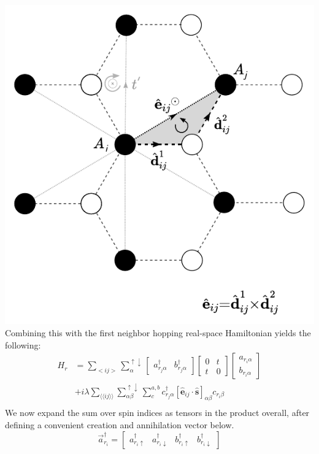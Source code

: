 \documentclass[10pt,a4paper]{article}\usepackage[]{graphicx}\usepackage[]{color}
\begin{document}
\begin{multicols}{2}
\includegraphics[scale=0.7]{hc2nn.pdf}
\noindent
Combining this with the first neighbor hopping real-space Hamiltonian yields the following:
\begin{align*}
H_r &= 
\sum_{<ij>}\sum_{\alpha}^{\uparrow \downarrow}
\begin{bmatrix}
a^{\dagger}_{r_j\alpha} & b^{\dagger}_{r_j\alpha}
\end{bmatrix}
\begin{bmatrix}
0& t\\
t & 0
\end{bmatrix}
\begin{bmatrix}
a_{r_i\alpha} \\ b_{r_i\alpha}
\end{bmatrix}\\
& +i\lambda\sum_{\langle\langle ij \rangle\rangle}\sum_{\alpha\beta}^{\uparrow \downarrow}\sum_{c}^{a,b} c^{\dagger}_{r_j \alpha}\left[ \hat{\mathbf{e}}_{ij}\cdot \hat{\mathbf{s}} \right]_{\alpha\beta}c_{r_i \beta}\\
\end{align*}
We now expand the sum over spin indices as tensors in the product overall, after defining a convenient creation and annihilation vector below.
$$
\vec{a}^{\dagger}_{r_i} = \begin{bmatrix}
a_{r_i\uparrow}^{\dagger } & a_{r_i\downarrow}^{\dagger }
& b_{r_i\uparrow}^{\dagger } & b_{r_i\downarrow}^{\dagger }
\end{bmatrix}
$$


\end{multicols}
\end{document}
